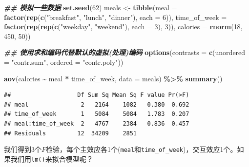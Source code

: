 \documentclass[
]{book}
\newenvironment{Shaded}{\begin{snugshade}}{\end{snugshade}}
\newcommand{\AttributeTok}[1]{\textcolor[rgb]{0.13,0.29,0.53}{#1}}
\newcommand{\DecValTok}[1]{\textcolor[rgb]{0.00,0.00,0.81}{#1}}
\newcommand{\DocumentationTok}[1]{\textcolor[rgb]{0.56,0.35,0.01}{\textbf{\textit{#1}}}}
\newcommand{\FunctionTok}[1]{\textcolor[rgb]{0.13,0.29,0.53}{\textbf{#1}}}
\newcommand{\NormalTok}[1]{#1}
\newcommand{\OtherTok}[1]{\textcolor[rgb]{0.56,0.35,0.01}{#1}}
\newcommand{\SpecialCharTok}[1]{\textcolor[rgb]{0.81,0.36,0.00}{\textbf{#1}}}
\newcommand{\StringTok}[1]{\textcolor[rgb]{0.31,0.60,0.02}{#1}}
\begin{document}
\begin{Shaded}
\begin{Highlighting}[]
\DocumentationTok{\#\# 模拟一些数据}
\FunctionTok{set.seed}\NormalTok{(}\DecValTok{62}\NormalTok{)}
\NormalTok{meals }\OtherTok{\textless{}{-}} \FunctionTok{tibble}\NormalTok{(}\AttributeTok{meal =} \FunctionTok{factor}\NormalTok{(}\FunctionTok{rep}\NormalTok{(}\FunctionTok{c}\NormalTok{(}\StringTok{"breakfast"}\NormalTok{, }\StringTok{"lunch"}\NormalTok{, }\StringTok{"dinner"}\NormalTok{),}
                                  \AttributeTok{each =} \DecValTok{6}\NormalTok{)),}
                \AttributeTok{time\_of\_week =} \FunctionTok{factor}\NormalTok{(}\FunctionTok{rep}\NormalTok{(}\FunctionTok{rep}\NormalTok{(}\FunctionTok{c}\NormalTok{(}\StringTok{"weekday"}\NormalTok{, }\StringTok{"weekend"}\NormalTok{),}
                                              \AttributeTok{each =} \DecValTok{3}\NormalTok{), }\DecValTok{3}\NormalTok{)),}
                \AttributeTok{calories =} \FunctionTok{rnorm}\NormalTok{(}\DecValTok{18}\NormalTok{, }\DecValTok{450}\NormalTok{, }\DecValTok{50}\NormalTok{))}

\DocumentationTok{\#\# 使用求和编码代替默认的虚拟(处理)编码}
\FunctionTok{options}\NormalTok{(}\AttributeTok{contrasts =} \FunctionTok{c}\NormalTok{(}\AttributeTok{unordered =} \StringTok{"contr.sum"}\NormalTok{, }\AttributeTok{ordered =} \StringTok{"contr.poly"}\NormalTok{))}

\FunctionTok{aov}\NormalTok{(calories }\SpecialCharTok{\textasciitilde{}}\NormalTok{ meal }\SpecialCharTok{*}\NormalTok{ time\_of\_week, }\AttributeTok{data =}\NormalTok{ meals) }\SpecialCharTok{\%\textgreater{}\%}
  \FunctionTok{summary}\NormalTok{()}
\end{Highlighting}
\end{Shaded}

\begin{verbatim}
##                   Df Sum Sq Mean Sq F value Pr(>F)
## meal               2   2164    1082   0.380  0.692
## time_of_week       1   5084    5084   1.783  0.207
## meal:time_of_week  2   4767    2384   0.836  0.457
## Residuals         12  34209    2851
\end{verbatim}

我们得到3个\(F\)检验，每个主效应各1个(\texttt{meal}和\texttt{time\_of\_week})，交互效应1个。如果我们用\texttt{lm()}来拟合模型呢？
\end{document}
